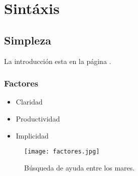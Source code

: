 \section{Sintáxis}\label{sec:syntax}
\lipsum[1]
\lipsum[1]

\subsection{Simpleza}
\lipsum[1]
La introducción esta en la página \pageref{sec:intro}.

\subsubsection{Factores}
\begin{itemize}
	\item Claridad
	\item Productividad
	\item Implicidad
\end{itemize}
\begin{figure}[H]
	\centering
	\texttt{[image: factores.jpg]}
	\caption[Búsqueda de ayuda]{Búsqueda de ayuda entre los mares.}
	\label{fig:features}
\end{figure}
